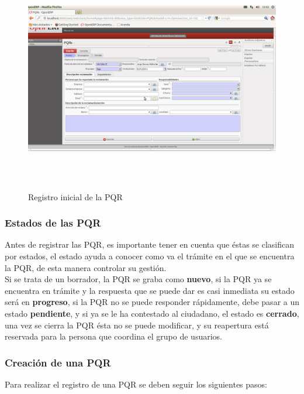 \begin{figure}
 \centering
 \includegraphics[width=17cm,height=10cm]{./Imagenes/formularioregistro.png}
 \caption{Registro inicial de la PQR}
 \label{fig:formularioregistro}
\end{figure}

\subsubsection{Estados de las PQR}

Antes de registrar las PQR, es importante tener en cuenta que éstas se clasifican por estados, 
el estado ayuda a conocer como va el trámite en el que se encuentra la PQR, de esta manera controlar su gestión.\\

Si se trata de un borrador, la PQR se graba como \textbf{nuevo}, si la PQR ya se encuentra en trámite y la respuesta que se puede dar es casi inmediata
su estado será en \textbf{progreso}, si la PQR no se puede responder rápidamente, debe pasar a un estado \textbf{pendiente}, y si ya se le ha contestado al ciudadano, 
el estado es \textbf{cerrado}, una vez se cierra la PQR ésta no se puede modificar, y su reapertura está reservada para la persona que coordina el 
grupo de usuarios.

\subsubsection{Creación de una PQR}

Para realizar el registro de una PQR se deben seguir los siguientes pasos:

